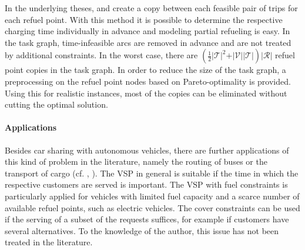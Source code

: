 In the underlying theses, \cite{Kaiser} and \cite{Knoll} create a copy between each feasible pair of trips for each refuel point. With this method it is possible to determine the respective charging time individually in advance and modeling partial refueling is easy. In the task graph, time-infeasible arcs are removed in advance and are not treated by additional constraints. In the worst case, there are ${\left(\frac 1 2 \vert\mathcal{T}\vert^2 + \vert\mathcal{V}\vert\vert\mathcal{T}\vert\right)\vert\mathcal{R}\vert}$ refuel point copies in the task graph. In order to reduce the size of the task graph, a preprocessing on the refuel point nodes based on Pareto-optimality is provided. Using this for realistic instances, most of the copies can be eliminated without cutting the optimal solution.

\paragraph{Applications} \parfill

Besides car sharing with autonomous vehicles, there are further applications of this kind of problem in the literature, namely the routing of buses or the transport of cargo (cf. \cite{Wen}, \cite{Adler}). The VSP in general is suitable if the time in which the respective customers are served is important. The VSP with fuel constraints is particularly applied for vehicles with limited fuel capacity and a scarce number of available refuel points, such as electric vehicles. The cover constraints can be used if the serving of a subset of the requests suffices, for example if customers have several alternatives. To the knowledge of the author, this issue has not been treated in the literature.
